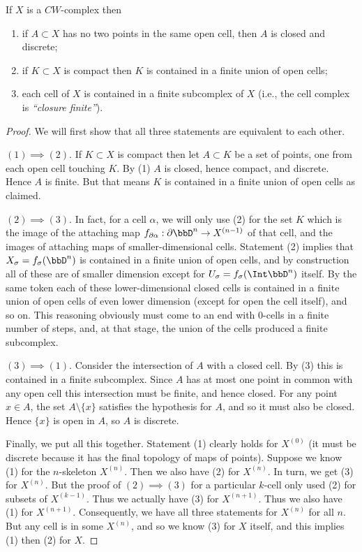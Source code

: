 \begin{prop}\label{prop 8.1 Bredon}
    If $X$ is a $CW$-complex then
    \begin{enumerate}[label=(\arabic*)]
        \item if $A\subset X$ has no two points in the same open cell, then $A$ is closed and discrete;
        \item if $K\subset X$ is compact then $K$ is contained in a finite union of open cells;
        \item each cell of $X$ is contained in a finite subcomplex of $X$ (i.e., the cell complex is \emph{``closure finite''}).
    \end{enumerate}
\end{prop}
\begin{proof}
    We will first show that all three statements are equivalent to each other.
    
    $(1)\implies (2)$. If $K\subset X$ is compact then let $A\subset K$ be a set of points, one from each open cell touching $K$. By (1) $A$ is closed, hence compact, and discrete. Hence $A$ is finite. But that means $K$ is contained in a finite union of open cells as claimed.

    $(2)\implies(3)$. In fact, for a cell $\alpha$, we will only use (2) for the set $K$ which is the image of the attaching map $f_{\partial \alpha}:\partial \bbD^n\to X^{(n-1)}$ of that cell, and the images of attaching maps of smaller-dimensional cells. Statement (2) implies that $X_\sigma=f_\sigma(\bbD^n)$ is contained in a finite union of open cells, and by construction all of these are of smaller dimension except for $U_\sigma=f_\sigma(\Int \bbD^n)$ itself. By the same token each of these lower-dimensional closed cells is contained in a finite union of open cells of even lower dimension (except for open the cell itself), and so on. This reasoning obviously must come to an end with $0$-cells in a finite number of steps, and, at that stage, the union of the cells produced a finite subcomplex.

    $(3)\implies(1)$. Consider the intersection of $A$ with a closed cell. By (3) this is contained in a finite subcomplex. Since $A$ has at most one point in common with any open cell this intersection must be finite, and hence closed. For any point $x\in A$, the set $A\setminus\{x\}$ satisfies the hypothesis for $A$, and so it must also be closed. Hence $\{x\}$ is open in $A$, so $A$ is discrete.

    Finally, we put all this together. Statement (1) clearly holds for $X^{(0)}$ (it must be discrete because it has the final topology of maps of points). Suppose we know (1) for the $n$-skeleton $X^{(n)}$. Then we also have (2) for $X^{(n)}$. In turn, we get (3) for $X^{(n)}$. But the proof of $(2)\implies(3)$ for a particular $k$-cell only used (2) for subsets of $X^{(k-1)}$. Thus we actually have (3) for $X^{(n+1)}$. Thus we also have (1) for $X^{(n+1)}$. Consequently, we have all three statements for $X^{(n)}$ for all $n$. But any cell is in some $X^{(n)}$, and so we know (3) for $X$ itself, and this implies (1) then (2) for $X$.
\end{proof} 
